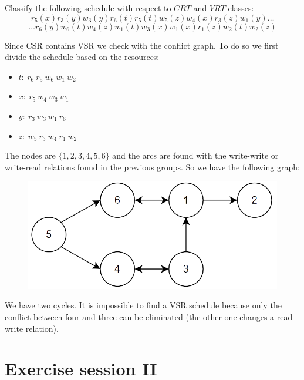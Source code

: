 \documentclass[12pt, a4paper]{report}
\newtheorem[style=M,bodystyle=\normalfont]{theorem}{Theorem}
\newtheorem[style=M,bodystyle=\normalfont]{corollary}{Corollary}
\newtheorem[style=M,bodystyle=\normalfont]{lemma}{Lemma}
\newtheorem[style=M,bodystyle=\normalfont]{definition}{Definition}
\begin{document}
    \begin{Exercise}[label=6]
        Classify the following schedule with respect to $CRT$ and $VRT$ classes: 
        \[r_5(x) r_3(y) w_3(y) r_6(t) r_5(t) w_5(z) w_4(x) r_3(z) w_1(y) \dots\]
        \[\dots r_6(y) w_6(t) w_4(z) w_1(t) w_3(x) w_1(x) r_1(z) w_2(t) w_2(z)\]
    \end{Exercise}
    \begin{Answer}[ref=6]
        Since CSR contains VSR we check with the conflict graph. To do so we first divide the schedule based on the resources: 
        \begin{itemize}
            \item $t: \: r_6 \: r_5 \: w_6 \: w_1 \: w_2$
            \item $x: \: r_5 \: w_4 \: w_3 \: w_1$
            \item $y: \: r_3 \: w_3 \: w_1 \: r_6$
            \item $z: \: w_5 \: r_3 \: w_4 \: r_1 \: w_2$
        \end{itemize}
        The nodes are $\{1,2,3,4,5,6\}$ and the arcs are found with the write-write or write-read relations found in the previous groups. So we have the following graph:
        \begin{figure}[H]
            \centering
            \includegraphics[width=0.5\linewidth]{images/conflictgraph3.png}
        \end{figure}
        We have two cycles. It is impossible to find a VSR schedule because only the conflict between four and three can be eliminated (the other one changes a read-write relation).
    \end{Answer}

    \newpage

    \chapter{Exercise session II}
\end{document}
